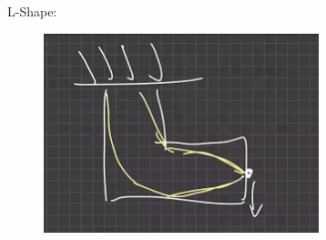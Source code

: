 \documentclass[a4paper, 12pt]{scrartcl}
\begin{document}
L-Shape:
\begin{figure}[h]
\includegraphics[width=8cm]{graphics/lshapepic.png}
\end{figure}
\end{document}
